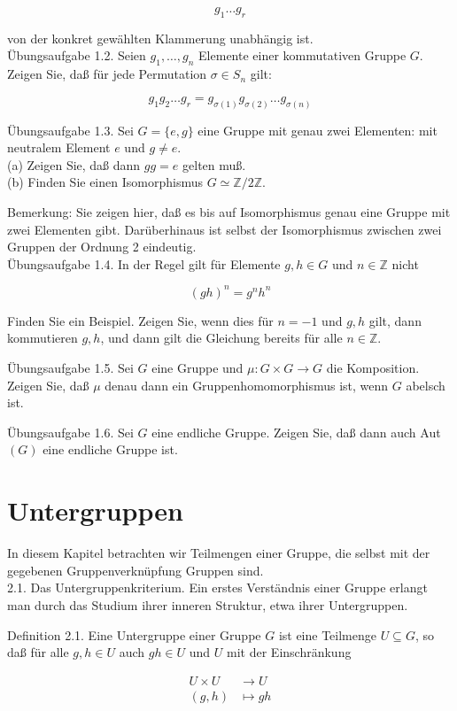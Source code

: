 \documentclass[10pt, letterpaper]{article}
\begin{document}
$$
g_{1} \ldots g_{r}
$$

von der konkret gewählten Klammerung unabhängig ist.\\
Übungsaufgabe 1.2. Seien $g_{1}, \ldots, g_{n}$ Elemente einer kommutativen Gruppe $G$. Zeigen Sie, daß für jede Permutation $\sigma \in S_{n}$ gilt:

$$
g_{1} g_{2} \ldots g_{r}=g_{\sigma(1)} g_{\sigma(2)} \ldots g_{\sigma(n)}
$$

Übungsaufgabe 1.3. Sei $G=\{e, g\}$ eine Gruppe mit genau zwei Elementen: mit neutralem Element $e$ und $g \neq e$.\\
(a) Zeigen Sie, daß dann $g g=e$ gelten muß.\\
(b) Finden Sie einen Isomorphismus $G \simeq \mathbb{Z} / 2 \mathbb{Z}$.

Bemerkung: Sie zeigen hier, daß es bis auf Isomorphismus genau eine Gruppe mit zwei Elementen gibt. Darüberhinaus ist selbst der Isomorphismus zwischen zwei Gruppen der Ordnung 2 eindeutig.\\
Übungsaufgabe 1.4. In der Regel gilt für Elemente $g, h \in G$ und $n \in \mathbb{Z}$ nicht

$$
(g h)^{n}=g^{n} h^{n}
$$

Finden Sie ein Beispiel. Zeigen Sie, wenn dies für $n=-1$ und $g, h$ gilt, dann kommutieren $g, h$, und dann gilt die Gleichung bereits für alle $n \in \mathbb{Z}$.

Übungsaufgabe 1.5. Sei $G$ eine Gruppe und $\mu: G \times G \rightarrow G$ die Komposition. Zeigen Sie, daß $\mu$ denau dann ein Gruppenhomomorphismus ist, wenn $G$ abelsch ist.

Übungsaufgabe 1.6. Sei $G$ eine endliche Gruppe. Zeigen Sie, daß dann auch Aut $(G)$ eine endliche Gruppe ist.

\section*{Untergruppen}
In diesem Kapitel betrachten wir Teilmengen einer Gruppe, die selbst mit der gegebenen Gruppenverknüpfung Gruppen sind.\\
2.1. Das Untergruppenkriterium. Ein erstes Verständnis einer Gruppe erlangt man durch das Studium ihrer inneren Struktur, etwa ihrer Untergruppen.

Definition 2.1. Eine Untergruppe einer Gruppe $G$ ist eine Teilmenge $U \subseteq G$, so daß für alle $g, h \in U$ auch $g h \in U$ und $U$ mit der Einschränkung

$$
\begin{aligned}
U \times U & \rightarrow U \\
(g, h) & \mapsto g h
\end{aligned}
$$
\end{document}
